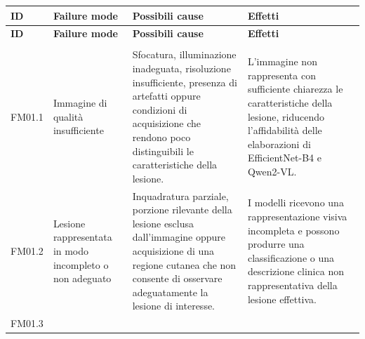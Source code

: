 {
\small
{}
\setlength{\tabcolsep}{4pt}
\renewcommand{\arraystretch}{1.08}

\begin{xltabular}{\textwidth}{
    >{\raggedright\arraybackslash}p{1.1cm}
    >{\raggedright\arraybackslash}p{3cm}
    >{\raggedright\arraybackslash}p{5cm}
    X
}

\toprule

\textbf{ID} &
\textbf{Failure mode} &
\textbf{Possibili cause} &
\textbf{Effetti} \\

\midrule

\endfirsthead

\toprule

\textbf{ID} &
\textbf{Failure mode} &
\textbf{Possibili cause} &
\textbf{Effetti} \\

\midrule

\endhead

 \\
\endfoot

\endlastfoot


FM01.1 &

Immagine di qualità insufficiente &

Sfocatura, illuminazione inadeguata, risoluzione insufficiente,
presenza di artefatti oppure condizioni di acquisizione che
rendono poco distinguibili le caratteristiche della lesione. &

L'immagine non rappresenta con sufficiente chiarezza le
caratteristiche della lesione, riducendo l'affidabilità delle
elaborazioni di EfficientNet-B4 e Qwen2-VL. \\

\midrule


FM01.2 &

Lesione rappresentata in modo incompleto o non adeguato &

Inquadratura parziale, porzione rilevante della lesione esclusa
dall'immagine oppure acquisizione di una regione cutanea che non
consente di osservare adeguatamente la lesione di interesse. &

I modelli ricevono una rappresentazione visiva incompleta e possono
produrre una classificazione o una descrizione clinica non
rappresentativa della lesione effettiva. \\

\midrule


FM01.3 &


\end{xltabular}}
